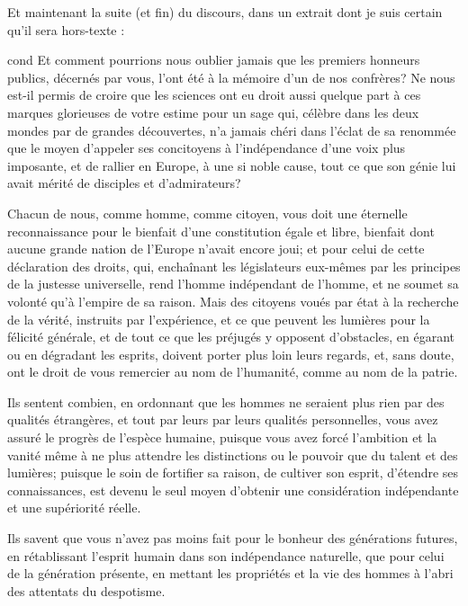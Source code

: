 Et maintenant la suite (et fin) du discours, dans un extrait dont je
suis certain qu'il sera \og hors-texte\fg{} :
%
\begin{displaycquote}[pp.~509-511]{cond}
  Et comment pourrions nous oublier jamais que les premiers honneurs
  publics, décernés par vous, l'ont été à la mémoire d'un de nos
  confrères? Ne nous est-il permis de croire que les sciences ont eu
  droit aussi quelque part à ces marques glorieuses de votre estime
  pour un sage qui, célèbre dans les deux mondes par de grandes
  découvertes, n'a jamais chéri dans l'éclat de sa renommée que le
  moyen d'appeler ses concitoyens à l'indépendance d'une voix plus
  imposante, et de rallier en Europe, à une si noble cause, tout ce
  que son génie lui avait mérité de disciples et d'admirateurs?

  Chacun de nous, comme homme, comme citoyen, vous doit une éternelle
  reconnaissance pour le bienfait d'une constitution égale et libre,
  bienfait dont aucune grande nation de l'Europe n'avait encore joui;
  et pour celui de cette déclaration des droits, qui, enchaînant les
  législateurs eux-mêmes par les principes de la justesse universelle,
  rend l'homme indépendant de l'homme, et ne soumet sa volonté qu'à
  l'empire de sa raison.  Mais des citoyens voués par état à la
  recherche de la vérité, instruits par l'expérience, et ce que
  peuvent les lumières pour la félicité générale, et de tout ce que
  les préjugés y opposent d'obstacles, en égarant ou en dégradant les
  esprits, doivent porter plus loin leurs regards, et, sans doute, ont
  le droit de vous remercier au nom de l'humanité, comme au nom de la
  patrie.

  Ils sentent combien, en ordonnant que les hommes ne seraient plus
  rien par des qualités étrangères, et tout par leurs par leurs
  qualités personnelles, vous avez assuré le progrès de l'espèce
  humaine, puisque vous avez forcé l'ambition et la vanité même à ne
  plus attendre les distinctions ou le pouvoir que du talent et des
  lumières; puisque le soin de fortifier sa raison, de cultiver son
  esprit, d'étendre ses connaissances, est devenu le seul moyen
  d'obtenir une considération indépendante et une supériorité réelle.

  Ils savent que vous n'avez pas moins fait pour le bonheur des
  générations futures, en rétablissant l'esprit humain dans son
  indépendance naturelle, que pour celui de la génération présente, en
  mettant les propriétés et la vie des hommes à l'abri des attentats
  du despotisme.


\end{displaycquote}
